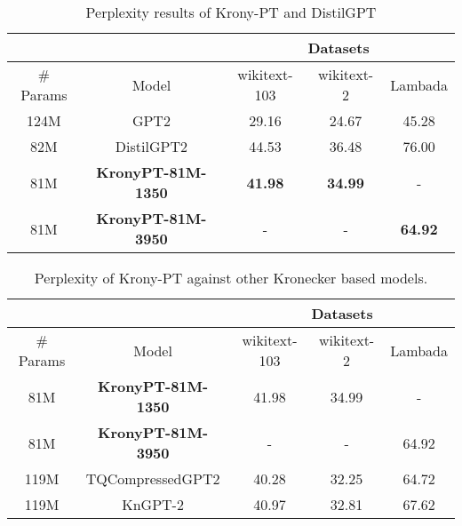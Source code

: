 \documentclass{article}
\begin{document}
{\begin{table}[h]
\centering
\begin{tabular}{|c|c|c|c|c|}
\hline
 & & \multicolumn{3}{c|}{Datasets} \\ \hline
\# Params &  Model            & wikitext-103 & wikitext-2 & Lambada \\ \hline
124M      & GPT2              & 29.16        & 24.67      & 45.28      \\ \hline
82M       & DistilGPT2        & 44.53        & 36.48      & 76.00      \\ \hline
81M       & \textbf{KronyPT-81M-1350}  & \textbf{41.98}   & \textbf{34.99}      & -          \\ \hline
81M       & \textbf{KronyPT-81M-3950}  & -            	  & -          & \textbf{64.92}      \\ \hline
\end{tabular}
\caption{Perplexity results of Krony-PT and DistilGPT}
\end{table}


\begin{table}[h]
\centering
\begin{tabular}{|c|c|c|c|c|}
\hline
 & & \multicolumn{3}{c|}{Datasets} \\ \hline
\# Params &  Model            & wikitext-103 & wikitext-2 & Lambada \\ \hline
81M       & \textbf{KronyPT-81M-1350}  & 41.98        & 34.99      & -          \\ \hline
81M       & \textbf{KronyPT-81M-3950}  & -            & -          & 64.92      \\ \hline
119M       & TQCompressedGPT2  & 40.28        & 32.25      & 64.72      \\ \hline
119M       & KnGPT-2   & 40.97        & 32.81      & 67.62      \\ \hline
\end{tabular}
\caption{Perplexity of Krony-PT against other Kronecker based models.}
\end{table}

\begin{comment}
	
\subsection{The 95M class:}%
\label{sub:The 95M class:}

\subsection{Scale test}%
\label{sub:Scale test}
How far can we push down the size? 


\end{comment}}
\end{document}

